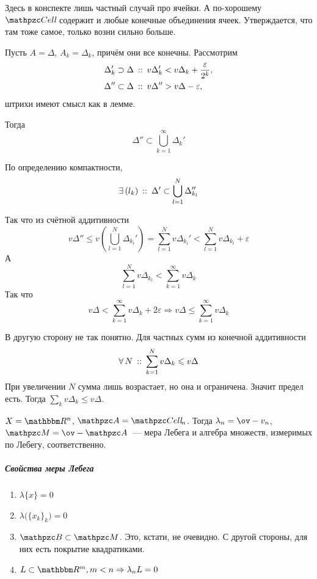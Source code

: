 \documentclass[draft, timbord]{longnotes}
\begin{document}
\begin{tproof}
  Здесь в конспекте лишь частный случай про ячейки. 
  А по-хорошему $\Cell$ содержит и любые конечные объединения ячеек.
  Утверждается, что там тоже самое, только возни сильно больше.

  Пусть $A = \Delta$, $A_k = \Delta_k$, причём они все конечны.
  Рассмотрим
  \begin{align*}
    \Delta_k' \supset \Delta &\:::\: v \Delta_k' < v \Delta_k + \frac{\varepsilon}{2^k},\\
    \Delta'' \subset \Delta    &\:::\: v \Delta'' > v \Delta - \varepsilon ,
  \end{align*}
  штрихи имеют смысл как в лемме.

  Тогда\[
    \Delta''  \subset \bigcup_{k=1}^\infty \Delta_k ' 
  \]

  По определению компактности, \[
    \exists\, (l_k) \that \Delta'  \subset \bigcup_{l=1}^N \Delta_{k_l}''
  \]
  
  Так что из счётной аддитивности
  \[
    v \Delta'' \leqslant v \left(\bigcup_{l=1}^N \Delta_{k_l}'\right)
    = \sum_{l=1}^N v \Delta_{k_l}' < \sum_{l=1}^N v \Delta_{k_l} + \varepsilon
  \]
  А \[
    \sum_{l=1}^N v \Delta_{k_l} <  \sum_{k=1}^\infty v \Delta_{k}
  \]
  Так что 
  \[
    v \Delta < \sum_{k=1}^\infty v \Delta_{k} + 2\varepsilon \Rightarrow
    v \Delta \leqslant \sum_{k=1}^\infty v \Delta_{k} 
  \]

  В другую сторону не так понятно. Для частных сумм из конечной аддитивности
  \[
    \forall\, N \:::\: \sum _{k=1}^N v \Delta_k \leqslant v \Delta
  \]
  При увеличении $N$ сумма лишь возрастает, но она и ограничена. Значит предел есть.
  Тогда $\sum_k v \Delta_k \leqslant v \Delta$.
\end{tproof}



\begin{defn}\label{defn:meas::ledeg::lebeg}
  $X=\R^n$, $\alg= \Cell_n$. Тогда $\lambda_n = \ov-{v_n}$, $\mathpzc M = \ov-{\alg}$~--- мера
  Лебега и алгебра множеств, измеримых по Лебегу, соответственно.
\end{defn}

\subparagraph{Свойства меры Лебега}

\begin{enumerate}[(1) $\triangleright$]
  \item $\lambda \{x\} = 0$
  \item $\lambda \bigl(\{x_k\}_{k}\bigr) = 0$
  \item $\borel \subset \lebesgue$. Это, кстати, не очевидно. С другой стороны, для них
    есть покрытие квадратиками.
  \item $L \subset \R^m, m<n \Rightarrow \lambda_n L  = 0$
\end{enumerate}
\end{document}
